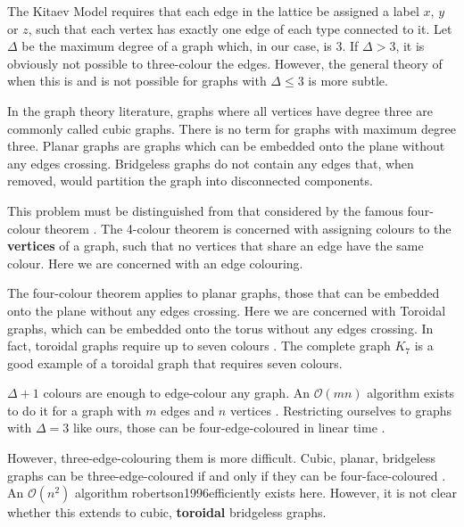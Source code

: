 The Kitaev Model requires that each edge in the lattice be assigned a label \(x\), \(y\) or \(z\), such that each vertex has exactly one edge of each type connected to it. Let \(\Delta\) be the maximum degree of a graph which, in our case, is 3. If \(\Delta > 3\), it is obviously not possible to three-colour the edges. However, the general theory of when this is and is not possible for graphs with \(\Delta \leq 3\) is more subtle.

In the graph theory literature, graphs where all vertices have degree three are commonly called cubic graphs. There is no term for graphs with maximum degree three. Planar graphs are graphs which can be embedded onto the plane without any edges crossing. Bridgeless graphs do not contain any edges that, when removed, would partition the graph into disconnected components.

This problem must be distinguished from that considered by the famous four-colour theorem \textcite{appelEveryPlanarMap1989} . The 4-colour theorem is concerned with assigning colours to the \textbf{vertices} of a graph, such that no vertices that share an edge have the same colour. Here we are concerned with an edge colouring.

The four-colour theorem applies to planar graphs, those that can be embedded onto the plane without any edges crossing. Here we are concerned with Toroidal graphs, which can be embedded onto the torus without any edges crossing. In fact, toroidal graphs require up to seven colours \textcite{heawoodMapColouringTheorems}. The complete graph \(K_7\) is a good example of a toroidal graph that requires seven colours.

\(\Delta + 1\) colours are enough to edge-colour any graph. An \(\mathcal{O}(mn)\) algorithm exists to do it for a graph with \(m\) edges and \(n\) vertices \textcite{gEstimateChromaticClass1964}. Restricting ourselves to graphs with \(\Delta = 3\) like ours, those can be four-edge-coloured in linear time \textcite{skulrattanakulchai4edgecoloringGraphsMaximum2002} .

However, three-edge-colouring them is more difficult. Cubic, planar, bridgeless graphs can be three-edge-coloured if and only if they can be four-face-coloured \textcite{tait1880remarks}. An \(\mathcal{O}(n^2)\) algorithm robertson1996efficiently exists here. However, it is not clear whether this extends to cubic, \textbf{toroidal} bridgeless graphs.

